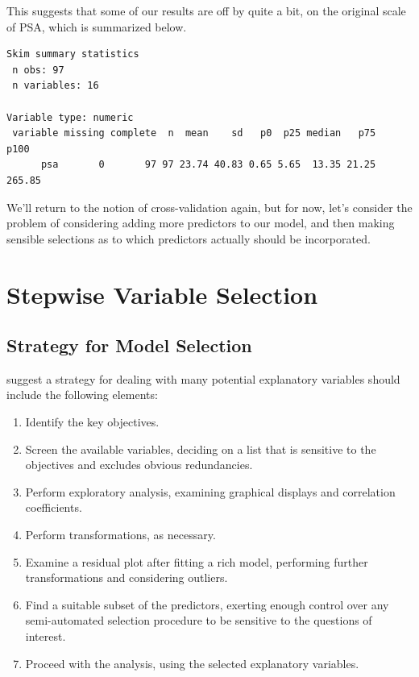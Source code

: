 \documentclass[]{book}
\newenvironment{Shaded}{\begin{snugshade}}{\end{snugshade}}
\newcommand{\KeywordTok}[1]{\textcolor[rgb]{0.13,0.29,0.53}{\textbf{#1}}}
\newcommand{\DataTypeTok}[1]{\textcolor[rgb]{0.13,0.29,0.53}{#1}}
\newcommand{\StringTok}[1]{\textcolor[rgb]{0.31,0.60,0.02}{#1}}
\newcommand{\OperatorTok}[1]{\textcolor[rgb]{0.81,0.36,0.00}{\textbf{#1}}}
\newcommand{\NormalTok}[1]{#1}
\providecommand{\tightlist}{%
  \setlength{\itemsep}{0pt}\setlength{\parskip}{0pt}}
\theoremstyle{definition}
\theoremstyle{definition}
\theoremstyle{definition}
\theoremstyle{remark}
\begin{document}
This suggests that some of our results are off by quite a bit, on the
original scale of PSA, which is summarized below.

\begin{Shaded}
\end{Shaded}

\begin{verbatim}
Skim summary statistics
 n obs: 97 
 n variables: 16 

Variable type: numeric 
 variable missing complete  n  mean    sd   p0  p25 median   p75   p100
      psa       0       97 97 23.74 40.83 0.65 5.65  13.35 21.25 265.85
\end{verbatim}

We'll return to the notion of cross-validation again, but for now, let's
consider the problem of considering adding more predictors to our model,
and then making sensible selections as to which predictors actually
should be incorporated.

\chapter{Stepwise Variable Selection}\label{stepwise-variable-selection}

\section{Strategy for Model
Selection}\label{strategy-for-model-selection}

\citet{RamseySchafer2002} suggest a strategy for dealing with many
potential explanatory variables should include the following elements:

\begin{enumerate}
\def\labelenumi{\arabic{enumi}.}
\tightlist
\item
  Identify the key objectives.
\item
  Screen the available variables, deciding on a list that is sensitive
  to the objectives and excludes obvious redundancies.
\item
  Perform exploratory analysis, examining graphical displays and
  correlation coefficients.
\item
  Perform transformations, as necessary.
\item
  Examine a residual plot after fitting a rich model, performing further
  transformations and considering outliers.
\item
  Find a suitable subset of the predictors, exerting enough control over
  any semi-automated selection procedure to be sensitive to the
  questions of interest.
\item
  Proceed with the analysis, using the selected explanatory variables.
\end{enumerate}
\end{document}
